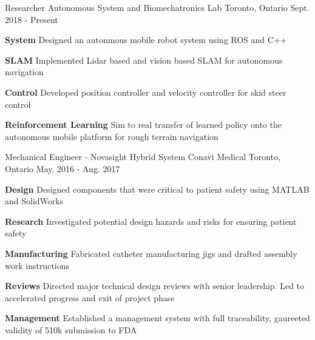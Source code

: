 \begin{cventries}
	\cventry
	{Researcher}
	{Autonomous System and Biomechatronics Lab}
	{Toronto, Ontario}
	{Sept. 2018 - Present}
	{
		\begin{cvitems}
			\item {
				\textbf{System} Designed an autonmous mobile robot system using ROS and C++
			}
			\item {
				\textbf{SLAM} Implemented Lidar based and vision based SLAM for autonomous navigation
			}
			\item {
				\textbf{Control} Developed position controller and velocity controller for skid steer control
			}
			\item {
				\textbf{Reinforcement Learning} Sim to real transfer of learned policy onto the autonomous mobile platform for rough terrain navigation
			}
		\end{cvitems}
	}
	\cventry
	{Mechanical Engineer - Novasight Hybrid System}
	{Conavi Medical} 
	{Toronto, Ontario}
	{May. 2016 - Aug. 2017}
	{
		\begin{cvitems}
			\item {
				\textbf{Design} Designed components that were critical to patient safety using MATLAB and SolidWorks
			}
			\item {
				\textbf{Research} Investigated potential design hazards and risks for ensuring patient safety
			}
			\item {
				\textbf{Manufacturing} Fabricated catheter manufacturing jigs and drafted assembly work instructions
			}
			\item {
				\textbf{Reviews} Directed major technical design reviews with senior leadership. Led to accelerated progress and exit of project phase
			}
			\item {
				\textbf{Management} Established a management system with full traceability, gaureeted validity of 510k submission to FDA
			}
		\end{cvitems}
	}  
\end{cventries}


